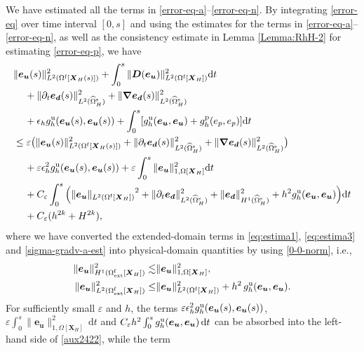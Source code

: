 \documentclass[11pt,reqno]{amsart}
\theoremstyle{definition}
\theoremstyle{plain}
\numberwithin{theorem}{section}
\numberwithin{proposition}{section}
\numberwithin{lemma}{section}
\numberwithin{equation}{section}
\newcommand{\bs}[1]{\boldsymbol{#1}}
\newcommand{\uu}[1]  {{\bs{#1}} }
\newcommand{\dep}{{{\bs{d}}}}
\newcommand{\grad}   { \uu{\nabla}    }
\def\d{\mathrm{d}}
\renewcommand{\(}{\bigl(}
\renewcommand{\)}{\bigr)}
\begin{document}
\begin{itemize}[leftmargin=20pt]
We have estimated all the terms in \eqref{error-eq-a}--\eqref{error-eq-n}. By integrating \eqref{error-eq} over time interval $[0,s]$ and using the estimates for the terms in \eqref{error-eq-a}--\eqref{error-eq-n}, as well as the  consistency estimate in Lemma \ref{Lemma:RhH-2} for estimating \eqref{error-eq-p}, we have 
\begin{align} \label{aux2422}
&\| {\bs e}_{\bs u}(s) \|_{L^2(\Omega^{\rm f}[\bs X_H(s)])}^2 
+ \int_0^s \| {\bs D}({\bs e}_{\bs u}) \|_{L^2(\Omega^{\rm f}[\bs X_H])}^2 \d t \notag\\
&\quad\, 
+ \|\partial_t{\bs e}_\dep(s)\|_{L^2(\widehat{\Omega}^{\rm s}_H)}^2 
+ \|\grad {\bs e}_\dep(s)\|_{L^2(\widehat{\Omega}^{\rm s}_H)}^2 \notag\\
&\quad\, 
+ \epsilon_h g_h^{\rm u} ({\bs e}_{\bs u}(s), {\bs e}_{\bs u}(s)) 
+ \int_0^s [g_h^{\rm u} ({\bs e}_{\bs u}, {\bs e}_{\bs u} ) + g_h^{\rm p} (e_p, e_p )] \d t\notag\\ 
&\le \varepsilon \big(\|{\bs e}_{\bs u}(s)\|_{L^2(\Omega^{\rm f}[\bs X_H(s)])}^2 + \|\partial_t{\bs e}_\dep(s)\|_{L^2(\widehat{\Omega}^{\rm s}_H)}^2 + \|\grad{\bs e}_\dep(s)\|_{L^2(\widehat{\Omega}^{\rm s}_H)}^2 \big) \notag\\
&\quad\, 
+ \varepsilon \epsilon_h^2 g^{\rm u}_h({\bs e}_{\bs u}(s),{\bs e}_{\bs u}(s)) + \varepsilon \int_0^s \|{\bs e}_{\bs u}\|_{1, \Omega[{\bs X}_H]}^2 \d t \notag\\
&\quad\,
+ C_\varepsilon \int_0^s \Big( {\|{\bs e}_{\bs u}\|_{L^2(\Omega^{\rm f}[{\bs X}_H])}}^2 +  \|\partial_t{\bs e}_{\dep}\|_{L^2(\widehat{\Omega}^{\rm s}_H)}^2 + \|{\bs e}_\dep\|_{H^1(\widehat{\Omega}^{\rm s}_H)}^2  + h^2 g_h^{\rm u}({\bs e}_{\bs u},{\bs e}_{\bs u}) \Big) \d t \notag\\
&\quad\, 
+ C_\varepsilon(h^{2k}+H^{2k}) ,
\end{align}
where we have converted the extended-domain terms in \eqref{eq:estima1}, \eqref{eq:estima3} and \eqref{sigma-gradv-a-est}
into physical-domain quantities by using \eqref{0-0-norm}, i.e., 
$$
\begin{aligned}
\|{\bs e}_{\bs u}\|_{H^1(\Omega^{\rm f}_{\rm ext}[{\bs X}_H])}^2
\lesssim & \|{\bs e}_{\bs u}\|_{1,\Omega[{\bs X}_H]}^2 , \\
\|{\bs e}_{\bs u}\|_{L^2(\Omega^{\rm f}_{\rm ext}[{\bs X}_H])}^2
\le &  \|{\bs e}_{\bs u}\|_{L^2(\Omega^{\rm f}[{\bs X}_H])}^2
+ h^2\, g_h^{\rm u}({\bs e}_{\bs u},{\bs e}_{\bs u}) .
\end{aligned}
$$
For sufficiently small $\varepsilon$ and $h$, the terms $\varepsilon \epsilon_h^2 g^{\rm u}_h({\bs e}_{\bs u}(s),{\bs e}_{\bs u}(s))$, $\varepsilon\int_0^s\|{\bs e}_{\bs u}\|_{1,\Omega[{\bs X}_H]}^2\,\d t$ and $C_\varepsilon h^2\int_0^s g_h^{\rm u}({\bs e}_{\bs u},{\bs e}_{\bs u})\,\d t$ can be absorbed into the left-hand side of \eqref{aux2422}, while the term 

\end{itemize}
\end{document}
